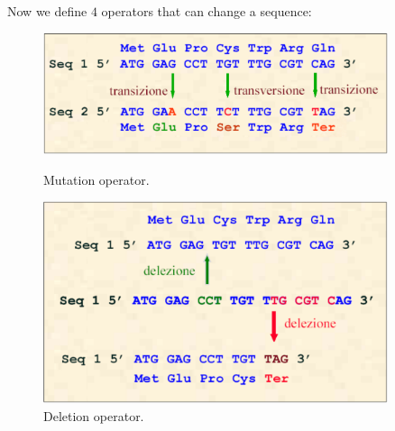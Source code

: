 Now we define $4$ operators that can change a sequence:
\begin{figure}[h]
	\begin{minipage}[t]{0.5\linewidth}
		\centering
		\includegraphics[width=0.9\textwidth]{img/mutation.png}
		\caption{Mutation operator.}
		\label{f1}
	\end{minipage}
	\hspace{0.1cm}
	\begin{minipage}[t]{0.5\linewidth} 
		\centering
		\includegraphics[width=0.9\textwidth]{img/deletions.png}
		\caption{Deletion operator.}
		\label{f2}
	\end{minipage}        
\end{figure} 

